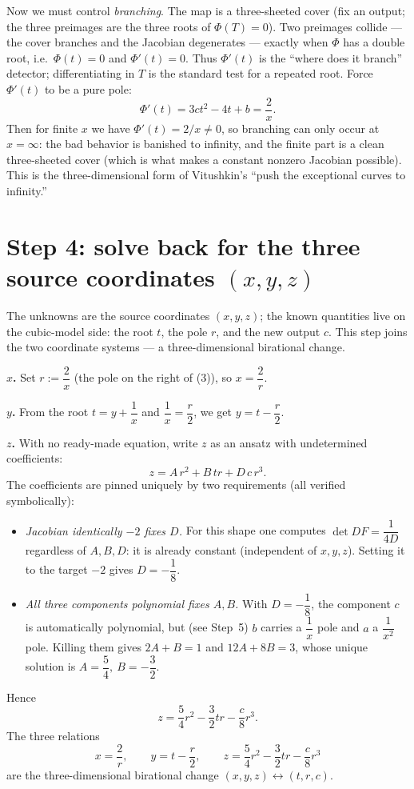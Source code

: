 \documentclass[11pt]{article}
\theoremstyle{plain}
\theoremstyle{definition}
\newcommand{\Jac}{\det DF}
\begin{document}
Now we must control \emph{branching}. The map is a three-sheeted cover (fix
an output; the three preimages are the three roots of $\Phi(T)=0$). Two
preimages collide --- the cover branches and the Jacobian degenerates ---
exactly when $\Phi$ has a double root, i.e.\ $\Phi(t)=0$ and $\Phi'(t)=0$.
Thus $\Phi'(t)$ is the ``where does it branch'' detector; differentiating in
$T$ is the standard test for a repeated root. Force $\Phi'(t)$ to be a pure
pole:
\begin{equation}
  \Phi'(t) = 3ct^2 - 4t + b = \frac{2}{x}. \label{eq:pole}
\end{equation}
Then for finite $x$ we have $\Phi'(t)=2/x\neq 0$, so branching can only occur
at $x=\infty$: the bad behavior is banished to infinity, and the finite part
is a clean three-sheeted cover (which is what makes a constant nonzero
Jacobian possible). This is the three-dimensional form of Vitushkin's
``push the exceptional curves to infinity.''

\section*{Step 4: solve back for the three source coordinates $(x,y,z)$}
The unknowns are the source coordinates $(x,y,z)$; the known quantities live
on the cubic-model side: the root $t$, the pole $r$, and the new output $c$.
This step joins the two coordinate systems --- a three-dimensional
birational change.

\medskip\noindent\textbf{$x$.} Set $r:=\dfrac2x$ (the pole on the right of
(3)), so $x=\dfrac2r$.

\medskip\noindent\textbf{$y$.} From the root $t=y+\dfrac1x$ and
$\dfrac1x=\dfrac r2$, we get $y=t-\dfrac r2$.

\medskip\noindent\textbf{$z$.} With no ready-made equation, write $z$ as an
ansatz with undetermined coefficients:
\[
  z = A\,r^2 + B\,tr + D\,c\,r^3 .
\]
The coefficients are pinned uniquely by two requirements (all verified
symbolically):
\begin{itemize}[nosep]
  \item \emph{Jacobian identically $-2$ fixes $D$.} For this shape one
        computes $\Jac=\dfrac{1}{4D}$ regardless of $A,B,D$: it is already
        constant (independent of $x,y,z$). Setting it to the target $-2$
        gives $D=-\dfrac18$.
  \item \emph{All three components polynomial fixes $A,B$.} With
        $D=-\dfrac18$, the component $c$ is automatically polynomial, but (see
        Step~5) $b$ carries a $\dfrac1x$ pole and $a$ a $\dfrac1{x^2}$ pole.
        Killing them gives $2A+B=1$ and $12A+8B=3$, whose unique solution is
        $A=\dfrac54,\ B=-\dfrac32$.
\end{itemize}
Hence
\[
  z=\frac54r^2-\frac32tr-\frac{c}{8}r^3 .
\]
The three relations
\[
  x=\frac2r,\qquad y=t-\frac r2,\qquad
  z=\frac54r^2-\frac32tr-\frac{c}{8}r^3
\]
are the three-dimensional birational change $(x,y,z)\leftrightarrow(t,r,c)$.
\end{document}

